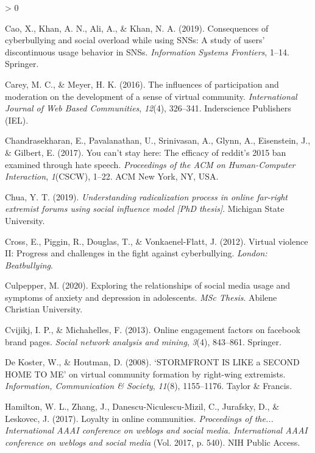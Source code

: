 \documentclass[
  10pt,
  dvipsnames]{scrartcl}
\newlength{\cslhangindent}
\newenvironment{CSLReferences}[2] %
 {%
  \setlength{\parindent}{0pt}
  \ifodd #1 \everypar{\setlength{\hangindent}{\cslhangindent}}\ignorespaces\fi
  \ifnum #2 > 0
  \setlength{\parskip}{#2\baselineskip}
  \fi
 }%
 {}
\begin{document}
\begin{CSLReferences}{1}{0}
\leavevmode\hypertarget{ref-cao2019consequences}{}%
Cao, X., Khan, A. N., Ali, A., \& Khan, N. A. (2019). Consequences of
cyberbullying and social overload while using SNSs: A study of users'
discontinuous usage behavior in SNSs. \emph{Information Systems
Frontiers}, 1--14. Springer.

\leavevmode\hypertarget{ref-carey2016influences}{}%
Carey, M. C., \& Meyer, H. K. (2016). The influences of participation
and moderation on the development of a sense of virtual community.
\emph{International Journal of Web Based Communities}, \emph{12}(4),
326--341. Inderscience Publishers (IEL).

\leavevmode\hypertarget{ref-chandrasekharan2017you}{}%
Chandrasekharan, E., Pavalanathan, U., Srinivasan, A., Glynn, A.,
Eisenstein, J., \& Gilbert, E. (2017). You can't stay here: The efficacy
of reddit's 2015 ban examined through hate speech. \emph{Proceedings of
the ACM on Human-Computer Interaction}, \emph{1}(CSCW), 1--22. ACM New
York, NY, USA.

\leavevmode\hypertarget{ref-chua2019understanding}{}%
Chua, Y. T. (2019). \emph{Understanding radicalization process in online
far-right extremist forums using social influence model {[}PhD
thesis{]}}. Michigan State University.

\leavevmode\hypertarget{ref-cross2012virtual}{}%
Cross, E., Piggin, R., Douglas, T., \& Vonkaenel-Flatt, J. (2012).
Virtual violence II: Progress and challenges in the fight against
cyberbullying. \emph{London: Beatbullying}.

\leavevmode\hypertarget{ref-culpepperexploring}{}%
Culpepper, M. (2020). Exploring the relationships of social media usage
and symptoms of anxiety and depression in adolescents. \emph{MSc
Thesis}. Abilene Christian University.

\leavevmode\hypertarget{ref-cvijikj2013online}{}%
Cvijikj, I. P., \& Michahelles, F. (2013). Online engagement factors on
facebook brand pages. \emph{Social network analysis and mining},
\emph{3}(4), 843--861. Springer.

\leavevmode\hypertarget{ref-de2008stormfront}{}%
De Koster, W., \& Houtman, D. (2008). {`STORMFRONT IS LIKE a SECOND HOME
TO ME'} on virtual community formation by right-wing extremists.
\emph{Information, Communication \& Society}, \emph{11}(8), 1155--1176.
Taylor \& Francis.

\leavevmode\hypertarget{ref-hamilton2017loyalty}{}%
Hamilton, W. L., Zhang, J., Danescu-Niculescu-Mizil, C., Jurafsky, D.,
\& Leskovec, J. (2017). Loyalty in online communities. \emph{Proceedings
of the... International AAAI conference on weblogs and social media.
International AAAI conference on weblogs and social media} (Vol. 2017,
p. 540). NIH Public Access.


\end{CSLReferences}
\end{document}

